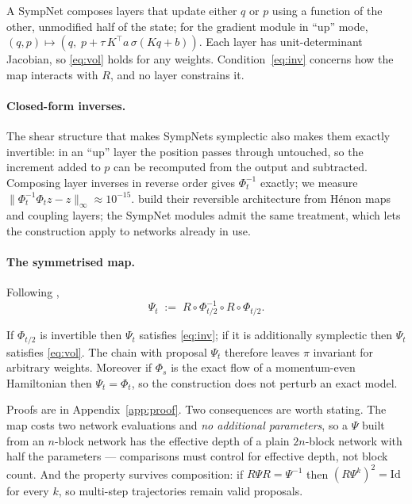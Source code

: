 \documentclass[mlabstract,onecolumn]{jmlr}
\newcommand{\flip}{R}
\begin{document}
A SympNet composes layers that update either $q$ or $p$ using a function of the
other, unmodified half of the state; for the gradient module in ``up'' mode,
$(q,p) \mapsto (q,\; p + \tau\, K^{\!\top} a\, \sigma(Kq + b))$. Each layer has
unit-determinant Jacobian, so \eqref{eq:vol} holds for any weights.
Condition~\eqref{eq:inv} concerns how the map interacts with $\flip$, and no
layer constrains it.

\paragraph{Closed-form inverses.} The shear structure that makes SympNets
symplectic also makes them exactly invertible: in an ``up'' layer the position
passes through untouched, so the increment added to $p$ can be recomputed from
the output and subtracted. Composing layer inverses in reverse order gives
$\Phi_t^{-1}$ exactly; we measure
$\|\Phi_t^{-1}\Phi_t z - z\|_\infty \approx 10^{-15}$.
\citet{valperga2022reversible} build their reversible architecture from
H\'enon maps and coupling layers; the SympNet modules admit the same treatment,
which lets the construction apply to networks already in use.

\paragraph{The symmetrised map.} Following \citet{valperga2022reversible},
\begin{equation}
    \Psi_t \;:=\; \flip \circ \Phi_{t/2}^{-1} \circ \flip \circ \Phi_{t/2}.
    \label{eq:psi}
\end{equation}

\begin{proposition}
\label{prop:involution}
If $\Phi_{t/2}$ is invertible then $\Psi_t$ satisfies \eqref{eq:inv}; if it is
additionally symplectic then $\Psi_t$ satisfies \eqref{eq:vol}. The chain with
proposal $\Psi_t$ therefore leaves $\pi$ invariant for arbitrary weights.
Moreover if $\Phi_s$ is the exact flow of a momentum-even Hamiltonian then
$\Psi_t = \Phi_t$, so the construction does not perturb an exact model.
\end{proposition}

Proofs are in Appendix~\ref{app:proof}. Two consequences are worth stating. The map
costs two network evaluations and \emph{no additional parameters}, so a $\Psi$
built from an $n$-block network has the effective depth of a plain $2n$-block
network with half the parameters --- comparisons must control for effective
depth, not block count. And the property survives composition: if
$\flip \Psi \flip = \Psi^{-1}$ then $(\flip \Psi^{k})^2 = \mathrm{Id}$ for
every $k$, so multi-step trajectories remain valid proposals.
\end{document}
